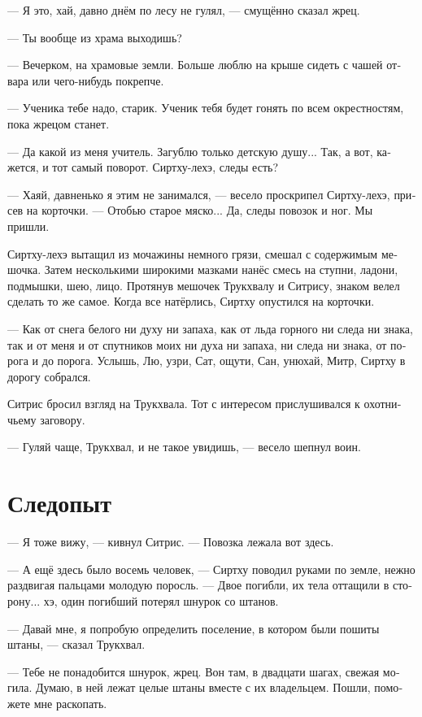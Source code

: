 \documentclass[a4paper,12pt,fleqn]{book}\usepackage{cooltooltips}\usepackage{polyglossia}\setdefaultlanguage[babelshorthands=true]{russian}\setotherlanguage{english}\defaultfontfeatures{Ligatures=TeX,Mapping=tex-text} \usepackage{xcolor}\definecolor{lightgray}{HTML}{bbbbbb}\color{lightgray}\newcommand{\ml}[3]{\textenglish{\textcolor{black}{#3}} }
\begin{document}
--- Я это, хай, давно днём по лесу не гулял, --- смущённо сказал жрец.

--- Ты вообще из храма выходишь?

--- Вечерком, на храмовые земли.
Больше люблю на крыше сидеть с чашей отвара или чего-нибудь покрепче.

--- Ученика тебе надо, старик.
Ученик тебя будет гонять по всем окрестностям, пока жрецом станет.

--- Да какой из меня учитель.
Загублю только детскую душу...
Так, а вот, кажется, и тот самый поворот.
Сиртху-лехэ, следы есть?

--- Хаяй, давненько я этим не занимался, --- весело проскрипел Сиртху-лехэ, присев на корточки.
--- Отобью старое мяско...
Да, следы повозок и ног.
Мы пришли.

Сиртху-лехэ вытащил из мочажины немного грязи, смешал с содержимым мешочка.
Затем несколькими широкими мазками нанёс смесь на ступни, ладони, подмышки, шею, лицо.
Протянув мешочек Трукхвалу и Ситрису, знаком велел сделать то же самое.
Когда все натёрлись, Сиртху опустился на корточки.

--- Как от снега белого ни духу ни запаха, как от льда горного ни следа ни знака, так и от меня и от спутников моих ни духа ни запаха, ни следа ни знака, от порога и до порога.
Услышь, Лю, узри, Сат, ощути, Сан, унюхай, Митр, Сиртху в дорогу собрался.

Ситрис бросил взгляд на Трукхвала.
Тот с интересом прислушивался к охотничьему заговору.

--- Гуляй чаще, Трукхвал, и не такое увидишь, --- весело шепнул воин.

\section{Следопыт}

--- Я тоже вижу, --- кивнул Ситрис.
--- Повозка лежала вот здесь.

--- А ещё здесь было восемь человек, --- Сиртху поводил руками по земле, нежно раздвигая пальцами молодую поросль.
--- Двое погибли, их тела оттащили в сторону... хэ, один погибший потерял шнурок со штанов.

--- Давай мне, я попробую определить поселение, в котором были пошиты штаны, --- сказал Трукхвал.

--- Тебе не понадобится шнурок, жрец.
Вон там, в двадцати шагах, свежая могила.
Думаю, в ней лежат целые штаны вместе с их владельцем.
Пошли, поможете мне раскопать.
\end{document}
